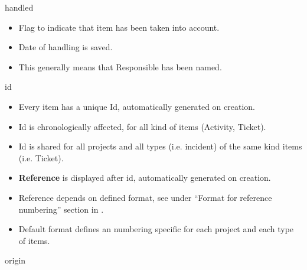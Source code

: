 \documentclass[letterpaper,10pt,english]{sphinxmanual}
\begin{document}
\begin{description}
\item[{handled}] \leavevmode{}\label{Glossary:term-handled}
\end{description}
\begin{itemize}
\item {} 
Flag to indicate that item has been taken into account.

\item {} 
Date of handling is saved.

\item {} 
This generally means that Responsible has been named.

\end{itemize}
\begin{description}
\item[{id}] \leavevmode{}\label{Glossary:term-id}
\end{description}
\begin{itemize}
\item {} 
Every item has a unique Id, automatically generated on creation.

\item {} 
Id is chronologically affected, for all kind of items (Activity, Ticket).

\item {} 
Id is shared for all projects and all types (i.e. incident) of the same kind items (i.e. Ticket).

\item {} 
\textbf{Reference} is displayed after id, automatically generated on creation.

\item {} 
Reference depends on defined format, see under ``Format for reference numbering'' section in {\hyperref[Administration:administration-global-parameters-label]{\emph{}}}.

\item {} 
Default format defines an numbering specific for each project and each type of items.

\end{itemize}
\begin{description}
\item[{origin}] \leavevmode{}\label{Glossary:term-origin}
\end{description}
\end{document}
